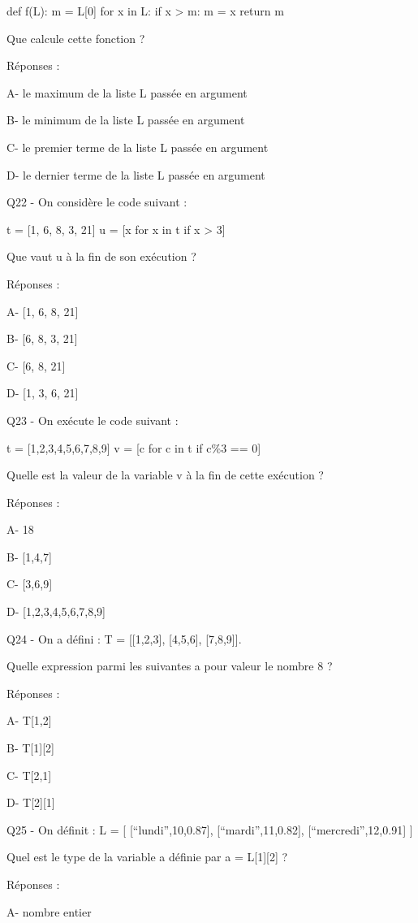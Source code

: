 \documentclass[
]{book}
\begin{document}
def f(L):
m = L{[}0{]}
for x in L:
if x \textgreater{} m:
m = x
return m

Que calcule cette fonction ?

Réponses :

A- le maximum de la liste L passée en argument

B- le minimum de la liste L passée en argument

C- le premier terme de la liste L passée en argument

D- le dernier terme de la liste L passée en argument

Q22 - On considère le code suivant :

t = {[}1, 6, 8, 3, 21{]}
u = {[}x for x in t if x \textgreater{} 3{]}

Que vaut u à la fin de son exécution ?

Réponses :

A- {[}1, 6, 8, 21{]}

B- {[}6, 8, 3, 21{]}

C- {[}6, 8, 21{]}

D- {[}1, 3, 6, 21{]}

Q23 - On exécute le code suivant :

t = {[}1,2,3,4,5,6,7,8,9{]}
v = {[}c for c in t if c\%3 == 0{]}

Quelle est la valeur de la variable v à la fin de cette exécution ?

Réponses :

A- 18

B- {[}1,4,7{]}

C- {[}3,6,9{]}

D- {[}1,2,3,4,5,6,7,8,9{]}

Q24 - On a défini : T = {[}{[}1,2,3{]}, {[}4,5,6{]}, {[}7,8,9{]}{]}.

Quelle expression parmi les suivantes a pour valeur le nombre 8 ?

Réponses :

A- T{[}1,2{]}

B- T{[}1{]}{[}2{]}

C- T{[}2,1{]}

D- T{[}2{]}{[}1{]}

Q25 - On définit :
L = {[} {[}``lundi'',10,0.87{]}, {[}``mardi'',11,0.82{]}, {[}``mercredi'',12,0.91{]} {]}

Quel est le type de la variable a définie par a = L{[}1{]}{[}2{]} ?

Réponses :

A- nombre entier
\end{document}

